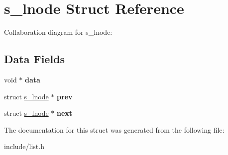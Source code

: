 \hypertarget{structs__lnode}{}\section{s\+\_\+lnode Struct Reference}
\label{structs__lnode}


Collaboration diagram for s\+\_\+lnode\+:
\subsection*{Data Fields}
\begin{DoxyCompactItemize}
\item 
\hypertarget{structs__lnode_a2e94a1e8984c8a1e7b72135bb8e31d29}{}void $\ast$ {\bfseries data}\label{structs__lnode_a2e94a1e8984c8a1e7b72135bb8e31d29}

\item 
\hypertarget{structs__lnode_aee8c355fad865420ad22055b3272049d}{}struct \hyperlink{structs__lnode}{s\+\_\+lnode} $\ast$ {\bfseries prev}\label{structs__lnode_aee8c355fad865420ad22055b3272049d}

\item 
\hypertarget{structs__lnode_a07ec49a3b71459b4f560ae2ac571802c}{}struct \hyperlink{structs__lnode}{s\+\_\+lnode} $\ast$ {\bfseries next}\label{structs__lnode_a07ec49a3b71459b4f560ae2ac571802c}

\end{DoxyCompactItemize}


The documentation for this struct was generated from the following file\+:\begin{DoxyCompactItemize}
\item 
include/list.\+h\end{DoxyCompactItemize}
